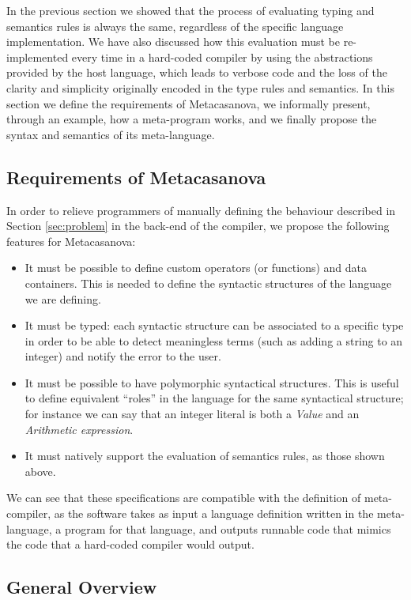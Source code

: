In the previous section we showed that the process of evaluating typing and semantics rules is always the same, regardless of the specific language implementation. We have also discussed how this evaluation must be re-implemented every time in a hard-coded compiler by using the abstractions provided by the host language, which leads to verbose code and the loss of the clarity and simplicity originally encoded in the type rules and semantics. In this section we define the requirements of Metacasanova, we informally present, through an example, how a meta-program works, and we finally propose the syntax and semantics of its meta-language.

\subsection{Requirements of Metacasanova}
In order to relieve programmers of manually defining the behaviour described in Section \ref{sec:problem} in the back-end of the compiler, we propose the following features for Metacasanova:

\begin{itemize}
	\item It must be possible to define custom operators (or functions) and data containers. This is needed to define the syntactic structures of the language we are defining.
	\item It must be typed: each syntactic structure can be associated to a specific type in order to be able to detect meaningless terms (such as adding a string to an integer) and notify the error to the user.
	\item It must be possible to have polymorphic syntactical structures. This is useful to define equivalent ``roles'' in the language for the same syntactical structure; for instance we can say that an integer literal is both a \textit{Value} and an \textit{Arithmetic expression}.
	\item It must natively support the evaluation of semantics rules, as those shown above.
\end{itemize}

We can see that these specifications are compatible with the definition of meta-compiler, as the software takes as input a language definition written in the meta-language, a program for that language, and outputs runnable code that mimics the code that a hard-coded compiler would output.

\subsection{General Overview}

